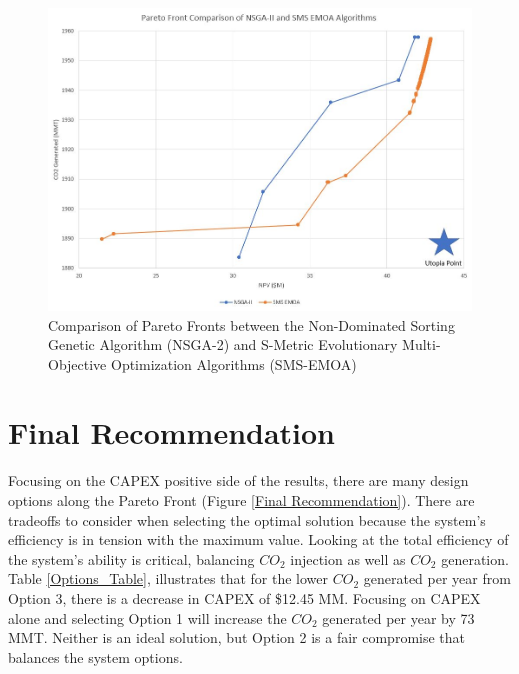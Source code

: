 \documentclass[balance,upint,subscriptcorrection,varvw,mathalfa=cal=boondoxo,spanish,french,vietnamese,russian,greek,pdf-a,colorlinks]{asmeconf}
\begin{document}
\begin{figure}[btp]
\centering\includegraphics[width=0.7\linewidth]{images/ParetoComparison.jpg}
\caption{Comparison of Pareto Fronts between the Non-Dominated Sorting Genetic Algorithm (NSGA-2) and S-Metric Evolutionary Multi-Objective Optimization Algorithms (SMS-EMOA)}\label{ParetoCompare:1}
\end{figure}


\begin{table}[btp]
\caption[Table]{SMS EMOA vs. NSGA-2}\label{EMOA:1}
\end{table}

\section{Final Recommendation}
Focusing on the CAPEX positive side of the results, there are many design options along the Pareto Front (Figure \ref{Final Recommendation}). There are tradeoffs to consider when selecting the optimal solution because the system's efficiency is in tension with the maximum value. Looking at the total efficiency of the system's ability is critical, balancing $CO_{2}$ injection as well as $CO_{2}$ generation. Table \ref{Options_Table}, illustrates that for the lower $CO_{2}$ generated per year from Option 3, there is a decrease in CAPEX of \$12.45 MM. Focusing on CAPEX alone and selecting Option 1 will increase the $CO_{2}$ generated per year by 73 MMT. Neither is an ideal solution, but Option 2 is a fair compromise that balances the system options. 
\end{document}
